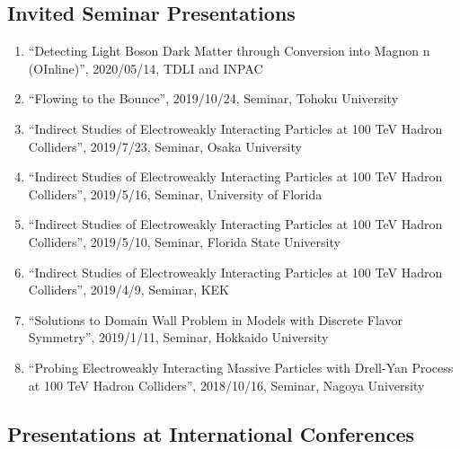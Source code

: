 \documentclass[12pt]{article}
\begin{document}
\subsection*{Invited Seminar Presentations}
\begin{enumerate}
 \item ``Detecting Light Boson Dark Matter through Conversion into Magnon n (OInline)'', 2020/05/14, TDLI and INPAC
 \item ``Flowing to the Bounce'', 2019/10/24, Seminar, Tohoku University
 \item ``Indirect Studies of Electroweakly Interacting Particles at 100 TeV Hadron Colliders'', 2019/7/23, Seminar, Osaka University
 \item ``Indirect Studies of Electroweakly Interacting Particles at 100 TeV Hadron Colliders'', 2019/5/16, Seminar, University of Florida
 \item ``Indirect Studies of Electroweakly Interacting Particles at 100 TeV Hadron Colliders'', 2019/5/10, Seminar, Florida State University
 \item ``Indirect Studies of Electroweakly Interacting Particles at 100 TeV Hadron Colliders'', 2019/4/9, Seminar, KEK
 \item ``Solutions to Domain Wall Problem in Models with Discrete Flavor Symmetry'', 2019/1/11, Seminar, Hokkaido University
 \item ``Probing Electroweakly Interacting Massive Particles with Drell-Yan Process at 100 TeV Hadron Colliders'', 2018/10/16, Seminar, Nagoya University
\end{enumerate}

\subsection*{Presentations at International Conferences}
\end{document}

